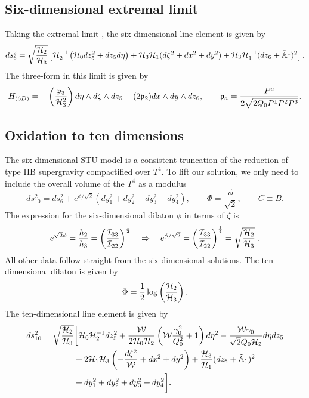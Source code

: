 \subsection*{Six-dimensional extremal limit}
Taking the extremal limit , the six-dimensional line element is given by
\begin{equation}
\label{eq:6dmet}
    ds_6^2 = \sqrt{\frac{{\cal H}_2}{{\cal H}_3}} \left[{\cal H}_2^{-1} \left({\cal H}_0 dz_5^2 + dz_5d\eta \right) + {\cal H}_3 {\cal H}_1 (d\zeta^2 + dx^2 + dy^2) + {\cal H}_3 {\cal H}_1^{-1}(dz_6 +\tilde{\mathbb{A}}^1)^2 \right].
\end{equation}
The three-form in this limit is given by
\begin{equation*}
        H_{(6D)} = -\left( \frac{ \mathfrak{p}_3}{{\cal H}_3^2} \right) d\eta \wedge d\zeta \wedge dz_5
 -( 2\mathfrak{p}_2) dx \wedge dy \wedge dz_6, \qquad \mathfrak{p}_a = \frac{ P^a}{2 \sqrt{2 Q_0 P^1 P^2 P^3}}.
\end{equation*}


\subsection{Oxidation to ten dimensions}
\label{sec:to10d}
The six-dimensional STU model is a consistent truncation of the reduction of type IIB supergravity compactified over $T^4$. To lift our solution, we only need to include the overall volume of the $T^4$ as a modulus
\begin{equation*}
    ds_{10}^2 = ds_6^2 + e^{\phi / \sqrt{2} }(dy_1^2 + dy_2^2 + dy_3^2 + dy_4^2), \qquad \Phi = \frac{\phi}{\sqrt{2}}, \qquad C \equiv B.
\end{equation*}
The expression for the six-dimensional dilaton $\phi$ in terms of $\zeta$ is
\begin{equation*}
    e^{\sqrt{2} \phi} = \frac{h_2}{h_3} = \left(\frac{{\cal I}_{33} }{{\cal I}_{22}}\right)^{\frac{1}{2}} \quad \Rightarrow \quad e^{\phi / \sqrt{2} } = \left(\frac{{\cal I}_{33} }{{\cal I}_{22}}\right)^{\frac{1}{4}} = \sqrt{\frac{{\cal H}_2}{{\cal H}_3}} \;.
\end{equation*}
All other data follow straight from the six-dimensional solutions.
The ten-dimensional dilaton is given by
\begin{equation*}
    \Phi = \frac{1}{2} \log \left(\frac{{\cal H}_2}{{\cal H}_3} \right).
\end{equation*}
The ten-dimensional line element is given by
\begin{equation*}
\begin{aligned}
        ds^2_{10} = \sqrt{\frac{{\cal H}_2}{{\cal H}_3}} &\bigg[{\cal H}_0 {\cal H}_2^{-1} dz_5^2 + \frac{{\cal W}}{2{\cal H}_0 {\cal H}_2}\left({\cal W} \frac{\gamma_0^2}{Q_0^2} + 1 \right) d\eta^2 - \frac{{\cal W} \gamma_0}{\sqrt{2} Q_0 {\cal H}_2} d\eta dz_5 \\ &+ 2{\cal H}_1 {\cal H}_3 \left(- \frac{ d\zeta^2}{{\cal W}} + dx^2 + dy^2 \right) + \frac{{\cal H}_3}{{\cal H}_1} (dz_6 + \tilde{\mathbb{A}}_1)^2 \\
        &+ dy_1^2 + dy_2^2 + dy_3^2 + dy_4^2 \bigg].
\end{aligned}
\end{equation*}

